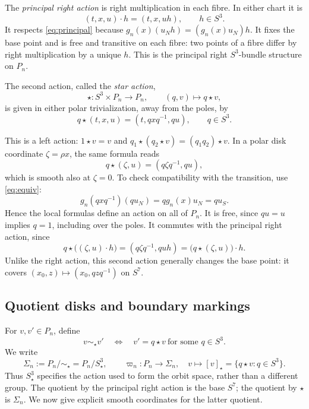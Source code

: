 \documentclass[12pt]{amsart}
\numberwithin{equation}{section}
\theoremstyle{remark}
\begin{document}
The \emph{principal right action} is right multiplication in each
fibre. In either chart it is
\[
 (t,x,u)\cdot h=(t,x,uh),\qquad h\in S^3.
\]
It respects \eqref{eq:principal} because
\(g_n(x)(u_Nh)=(g_n(x)u_N)h\). It fixes the base point and is
free and transitive on each fibre: two points of a fibre differ by
right multiplication by a unique \(h\). This is the principal
right \(S^3\)-bundle structure on \(P_n\).

The second action, called the \emph{star action},
\[
 \star:S^3\times P_n\longrightarrow P_n,
 \qquad (q,v)\longmapsto q\star v,
\]
is given in either polar trivialization, away from the poles, by
\begin{equation}\label{eq:star}
 q\star(t,x,u)=(t,qxq^{-1},qu),
 \qquad q\in S^3.
\end{equation}

This is a left action: \(1\star v=v\) and
\(q_1\star(q_2\star v)=(q_1q_2)\star v\). In a polar disk
coordinate \(\zeta=\rho x\), the same formula reads
\[
 q\star(\zeta,u)=(q\zeta q^{-1},qu),
\]
which is smooth also at \(\zeta=0\). To check compatibility with
the transition, use \eqref{eq:equiv}:
\[
 g_n(qxq^{-1})(qu_N)=qg_n(x)u_N=qu_S.
\]
Hence the local formulas define an action on all of \(P_n\).
It is free, since \(qu=u\) implies \(q=1\), including over the
poles. It commutes with the principal right action, since
\[
 q\star\bigl((\zeta,u)\cdot h\bigr)
 =(q\zeta q^{-1},quh)
 =\bigl(q\star(\zeta,u)\bigr)\cdot h.
\]
Unlike the right action, this second action generally changes the
base point: it covers \((x_0,z)\mapsto(x_0,qzq^{-1})\) on \(S^7\).

\subsection{Quotient disks and boundary markings}
For \(v,v'\in P_n\), define
\[
 v\sim_\star v'
 \quad\Longleftrightarrow\quad
 v'=q\star v\ \text{for some }q\in S^3.
\]
We write
\[
 \Sigma_n:=P_n/{\sim_\star}=P_n/S^3_\star,
 \qquad
 \varpi_n:P_n\longrightarrow\Sigma_n,\quad
 v\longmapsto[v]_\star=\{q\star v:q\in S^3\}.
\]
Thus \(S^3_\star\) specifies the action used to form the orbit
space, rather than a different group. The quotient by the principal
right action is the base \(S^7\); the quotient by \(\star\) is
\(\Sigma_n\). We now give explicit smooth coordinates for the
latter quotient.
\end{document}
